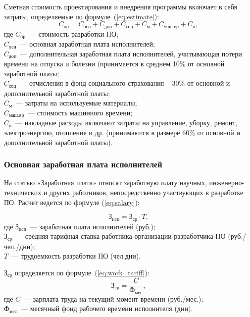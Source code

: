 Сметная стоимость проектирования и внедрения программы включает в себя затраты, определяемые по формуле~(\ref{eq:estimate}):
\begin{equation}\label{eq:estimate}
	C_{\text{пр}} = C_{\text{осн}} + C_{\text{доп}} + C_{\text{соц}} + C_{\text{м}} + C_{\text{маш.вр}} + C_{\text{н}},
\end{equation}
где $C_{\text{пр}}$~--- стоимость разработки ПО; \\
$C_{\text{осн}}$~--- основная заработная плата исполнителей; \\
$C_{\text{доп}}$~--- дополнительная заработная плата исполнителей, учитывающая потери времени на отпуска и болезни (принимается в среднем 10\% от основной заработной платы; \\
$C_{\text{соц}}$~--- отчисления в фонд социального страхования – 30\% от основной и дополнительной заработной платы; \\
$C_{\text{м}}$~--- затраты на используемые материалы; \\
$C_{\text{маш.вр}}$~--- стоимость машинного времени; \\
$C_{\text{н}}$~--- накладные расходы включают затраты на управление, уборку, ремонт, электроэнергию, отопление и др. (принимаются в размере 60\% от основной и дополнительной заработной платы).

\subsubsection{Основная заработная плата исполнителей}

На статью «Заработная плата» относят заработную плату научных, инженерно-технических и других работников, непосредственно участвующих в разработке ПО. Расчет ведется по формуле (\ref{eq:salary}):

\begin{equation}\label{eq:salary}
	\text{З}_{\text{исп}} = \text{З}_{\text{ср}} \cdot T,
\end{equation}
где $\text{З}_{\text{исп}}$~--- заработная плата исполнителей (руб.); \\
$\text{З}_{\text{ср}}$~--- средняя тарифная ставка работника организации разработчика ПО (руб./чел./дни); \\
$T$~--- трудоемкость разработки ПО (чел.дни).

$\text{З}_{\text{ср}}$ определяется по формуле~(\ref{eq:work_tariff}):
\begin{equation}\label{eq:work_tariff}
	\text{З}_{\text{ср}} = \frac{C}{\text{Ф}_{\text{мес}}},
\end{equation}
где $C$~--- зарплата труда на текущий момент времени (руб./мес.); \\
$\text{Ф}_{\text{мес}}$~--- месячный фонд рабочего времени исполнителя (дни).

